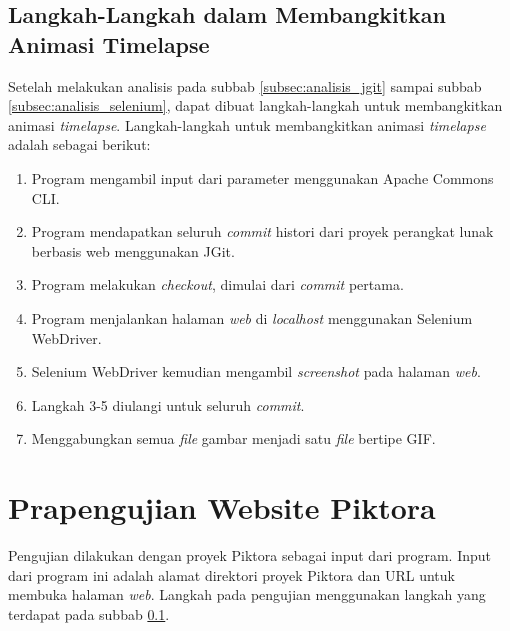 \subsection{Langkah-Langkah dalam Membangkitkan Animasi Timelapse}
\label{subsec:langkah_animasi}
Setelah melakukan analisis pada subbab \ref{subsec:analisis_jgit} sampai subbab \ref{subsec:analisis_selenium}, dapat dibuat langkah-langkah untuk membangkitkan animasi \textit{timelapse}. Langkah-langkah untuk membangkitkan animasi \textit{timelapse} adalah sebagai berikut:\\
\begin{enumerate}
\item Program mengambil input dari parameter menggunakan Apache Commons CLI.
\item Program mendapatkan seluruh \textit{commit} histori dari proyek perangkat lunak berbasis web menggunakan JGit.
\item Program melakukan \textit{checkout}, dimulai dari \textit{commit} pertama.
\item Program menjalankan halaman \textit{web} di \textit{localhost} menggunakan Selenium WebDriver.
\item Selenium WebDriver kemudian mengambil \textit{screenshot} pada halaman \textit{web}.
\item Langkah 3-5 diulangi untuk seluruh \textit{commit}.
\item Menggabungkan semua \textit{file} gambar menjadi satu \textit{file} bertipe GIF.
\end{enumerate}

\section{Prapengujian Website Piktora}
\label{sec:prapengujian}
Pengujian dilakukan dengan proyek Piktora sebagai input dari program. Input dari program ini adalah alamat direktori proyek Piktora dan URL untuk membuka halaman \textit{web}. Langkah pada pengujian menggunakan langkah yang terdapat pada subbab \ref{subsec:langkah_animasi}.


